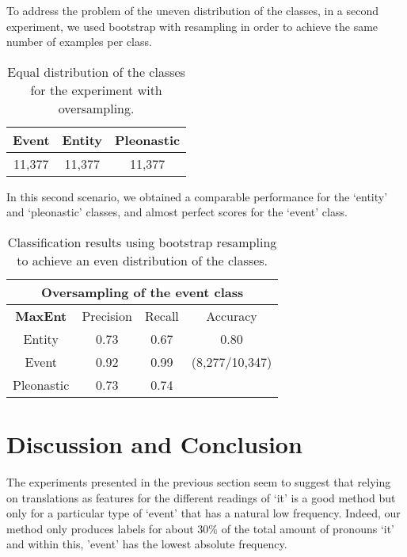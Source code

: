 \documentclass[10pt, a4paper]{article}
\begin{document}
To address the problem of the uneven distribution of the classes, in a second experiment, we used bootstrap with resampling in order to achieve the same number of examples per class. 

\begin{table}[h!]\centering
\begin{tabular}{ccc}
\toprule
\textbf{Event} & \textbf{Entity} & \textbf{Pleonastic} \\
\midrule
11,377 & 11,377 & 11,377 \\
\bottomrule
\end{tabular}
\caption{Equal distribution of the classes for the experiment with oversampling.}
\end{table}

In this second scenario, we obtained a comparable performance for the `entity' and `pleonastic' classes, and almost perfect scores for the `event' class. 

\begin{center} \begin{table}[h!] \begin{tabular}{cccc}
\multicolumn{4}{c}{\textbf{Oversampling of the event class}}\\ 
\toprule
\textbf{MaxEnt}& Precision & Recall & Accuracy \\ 
\midrule 
 Entity & 0.73 &0.67& 0.80 \\ 
 Event & 0.92 & 0.99 & (8,277/10,347) \\ 
  Pleonastic &  0.73 & 0.74 & \\
\bottomrule 
\end{tabular} 
\caption{Classification results using bootstrap
resampling to achieve an even distribution of the classes.}\label{tab:maxentoversampling}
\end{table}
\end{center}


\section{Discussion and Conclusion}

The experiments presented in the previous section seem to suggest that relying on translations as features for the different readings of `it' is a good method but only for a particular type of `event' that has a natural low frequency. Indeed, our method only produces labels for about 30\% of the total amount of pronouns `it' and within this, 'event' has the lowest absolute frequency. 
\end{document}
